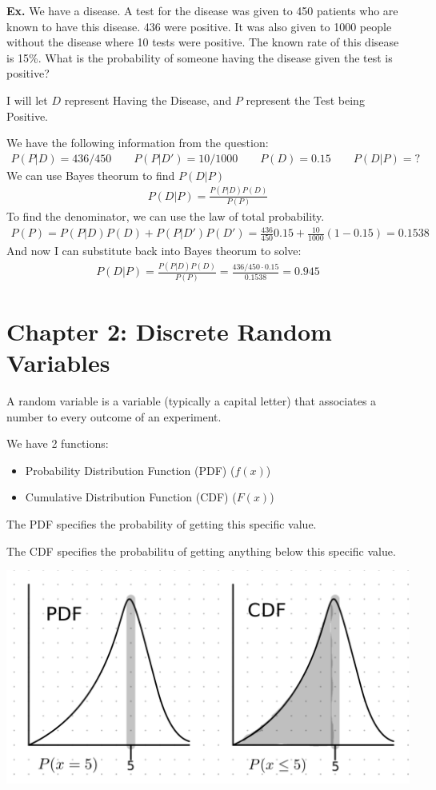 \documentclass[12pt,letterpaper]{article} \usepackage{amsmath} \usepackage{graphicx} \usepackage[margin=1in]{geometry} \usepackage{longtable}  \usepackage{amssymb}
\begin{document}
	\begin{mdframed}
		\textbf{Ex. }We have a disease. A test for the disease was given to 450 patients who are known to have this disease. 436 were positive. It was also given to 1000 people without the disease where 10 tests were positive. The known rate of this disease is 15\%. What is the probability of someone having the disease given the test is positive?
		
		I will let $D$ represent Having the Disease, and $P$ represent the Test being Positive.
		
		We have the following information from the question:
		\begin{align*}
			P(P|D) = 436/450 \qquad P(P|D\prime ) = 10/1000 \qquad P(D) = 0.15 \qquad P(D| P) = ?
		\end{align*}
		We can use Bayes theorum to find $P(D|P)$
		\begin{align*}
			P(D|P) = \frac{P(P|D)P(D)}{P(P)}
		\end{align*}
		To find the denominator, we can use the law of total probability. 
		\begin{align*}
			P(P) = P(P|D)P(D) + P(P|D\prime)P(D\prime) = \frac{436}{450}0.15 + \frac{10}{1000}(1-0.15) = 0.1538
		\end{align*}
		And now I can substitute back into Bayes theorum to solve:
		\begin{align*}
			P(D|P) = \frac{P(P|D)P(D)}{P(P)} = \frac{436/450 \cdot 0.15}{0.1538} = 0.945
		\end{align*}
	\end{mdframed}


	
	\section{Chapter 2: Discrete Random Variables}
	A random variable is a variable (typically a capital letter) that associates a number to every outcome of an experiment. 
	
	We have 2 functions:
	\begin{itemize}
		\item Probability Distribution Function (PDF) ($f(x)$)
		\item Cumulative Distribution Function (CDF) ($F(x)$)
	\end{itemize}

	The PDF specifies the probability of getting this specific value. 
	
	The CDF specifies the probabilitu of getting anything below this specific value. 
	\begin{center}
		\includegraphics[width=0.7\linewidth]{pdf-vs-cdf}
	\end{center}
\end{document}
